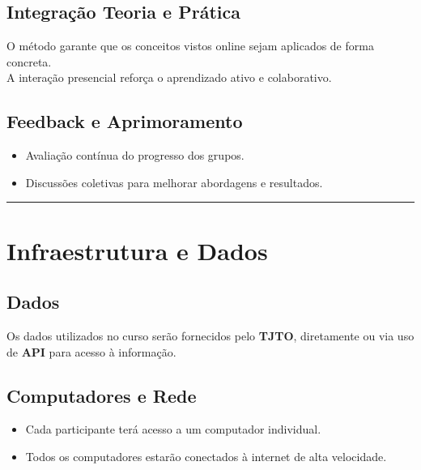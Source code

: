 \documentclass[
  letterpaper,
  DIV=11,
  numbers=noendperiod]{scrreprt}
\providecommand{\tightlist}{%
  \setlength{\itemsep}{0pt}\setlength{\parskip}{0pt}}
\begin{document}
\subsection{Integração Teoria e
Prática}\label{integrauxe7uxe3o-teoria-e-pruxe1tica}

O método garante que os conceitos vistos online sejam aplicados de forma
concreta.\\
A interação presencial reforça o aprendizado ativo e colaborativo.

\subsection{Feedback e Aprimoramento}\label{feedback-e-aprimoramento}

\begin{itemize}
\tightlist
\item
  Avaliação contínua do progresso dos grupos.\\
\item
  Discussões coletivas para melhorar abordagens e resultados.
\end{itemize}

\begin{center}\rule{0.5\linewidth}{0.5pt}\end{center}

\section{Infraestrutura e Dados}\label{infraestrutura-e-dados}

\subsection{Dados}\label{dados}

Os dados utilizados no curso serão fornecidos pelo \textbf{TJTO},
diretamente ou via uso de \textbf{API} para acesso à informação.

\subsection{Computadores e Rede}\label{computadores-e-rede}

\begin{itemize}
\tightlist
\item
  Cada participante terá acesso a um computador individual.\\
\item
  Todos os computadores estarão conectados à internet de alta
  velocidade.
\end{itemize}
\end{document}
